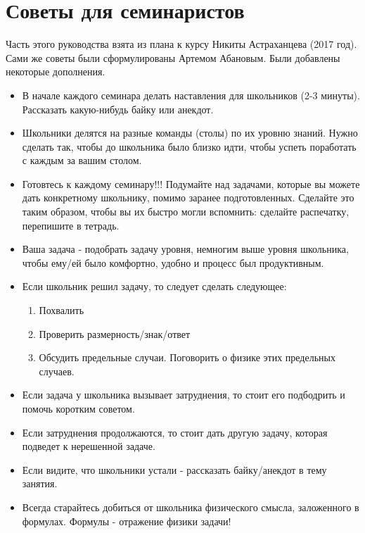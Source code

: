 \section*{Советы для семинаристов}

Часть этого руководства взята из плана к курсу Никиты Астраханцева (2017 год). Сами же советы были сформулированы Артемом Абановым. Были добавлены некоторые дополнения.
\begin{itemize}
    \item В начале каждого семинара делать наставления для школьников (2-3 минуты). Рассказать какую-нибудь байку или анекдот. 
    \item Школьники делятся на разные команды (столы) по их уровню знаний. Нужно сделать так, чтобы до школьника было близко идти, чтобы успеть поработать с каждым за вашим столом.
    \item Готовтесь к каждому семинару!!! Подумайте над задачами, которые вы можете дать конкретному школьнику, помимо заранее подготовленных. Сделайте это таким образом, чтобы вы их быстро могли вспомнить: сделайте распечатку, перепишите в тетрадь.
    \item Ваша задача - подобрать задачу уровня, немногим выше уровня школьника, чтобы ему/ей было комфортно, удобно и процесс был продуктивным.
    \item Если школьник решил задачу, то следует сделать следующее: 
    \begin{enumerate}
        \item Похвалить
        \item Проверить размерность/знак/ответ
        \item Обсудить предельные случаи. Поговорить о физике этих предельных случаев.
    \end{enumerate}
    \item Если задача у школьника вызывает затруднения, то стоит его подбодрить и помочь коротким советом.
    \item Если затруднения продолжаются, то стоит дать другую задачу, которая подведет к нерешенной задаче.
    \item Если видите, что школьники устали - рассказать байку/анекдот в тему занятия. 
    \item Всегда старайтесь добиться от школьника физического смысла, заложенного в формулах. Формулы - отражение физики задачи! 
\end{itemize}